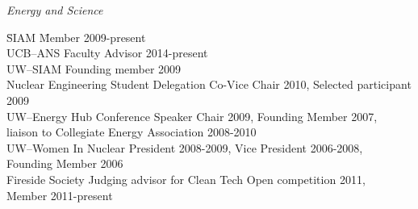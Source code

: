 \textit{Energy and Science}
\begin{tabbing}
\hspace*{2 em}\= SIAM  \hspace*{15em} \= Member 2009-present\\
%
\> UCB--ANS \> Faculty Advisor 2014-present  \\
%
%
\> UW--SIAM \> Founding member 2009\\
%
\> Nuclear Engineering Student Delegation \> Co-Vice Chair 2010, Selected participant 2009\\
%
\> UW--Energy Hub \> Conference Speaker Chair 2009, Founding Member 2007,  \\ \> \> liaison to Collegiate Energy Association 2008-2010\\
%
\> UW--Women In Nuclear \> President 2008-2009, Vice President 2006-2008,  \\ \> \> Founding Member 2006\\
%
%
\> Fireside Society \> Judging advisor for Clean Tech Open competition 2011,  \\ \> \>Member 2011-present
\end{tabbing}

